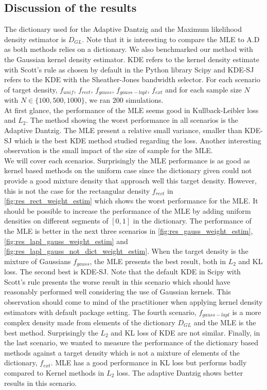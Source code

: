 \subsection{Discussion of the results}
The dictionary used for the Adaptive Dantzig and the Maximum likelihood density estimator is $D_{GL}$. Note that it is interesting to compare the MLE to A.D as both methods relies on a dictionary. We also benchmarked our method with the Gaussian kernel density estimator. KDE refers to the kernel density estimate with Scott's rule as chosen by default in the Python library Scipy and KDE-SJ refers to the KDE with the Sheather-Jones bandwidth selector. For each scenario of target density, $f_{unif}$, $f_{rect}$, $f_{gauss}$, $f_{gauss-lapl}$, $f_{ext}$ and for each sample size $N$  with $N\in\{100, 500, 1000\}$, we ran 200 simulations. \\
At first glance, the performance of the MLE seems good in Kullback-Leibler loss and $L_2$. The method showing the worst performance in all scenarios is the Adaptive Dantzig. The MLE present a relative small variance, smaller than KDE-SJ which is the best KDE method studied regarding the loss. Another interesting observation is the small impact of the size of sample for the MLE.\\
We will cover each scenarios. Surprisingly the MLE performance is as good as kernel based methods on the uniform case since the dictionary given could not provide a good mixture density that approach well this target density. However, this is not the case for the rectangular density $f_{rect}$ in \cref{fig:res_rect_weight_estim} which shows the worst performance for the MLE. It should be possible to increase the performance of the MLE by adding uniform densities on different segments of $[0,1]$ in the dictionary. The performance of the MLE is better in the next three scenarios in \cref{fig:res_gauss_weight_estim}, \cref{fig:res_lapl_gauss_weight_estim} and \cref{fig:res_lapl_gauss_not_dict_weight_estim}. When the target density is the mixture of Gaussians $f_{gauss}$, the MLE presents the best result, both in $L_2$ and KL loss. The second best is KDE-SJ. Note that the default KDE in Scipy with Scott's rule presents the worse result in this scenario which should have reasonably performed well considering the use of Gaussian kernels. This observation should come to mind of the practitioner when applying kernel density estimators with default package setting. The fourth scenario, $f_{gauss-lapl}$ is a more complex density made from elements of the dictionary $D_{GL}$ and the MLE is the best method. Surprisingly the $L_2$ and KL loss of KDE are not similar. Finally, in the last scenario, we wanted to measure the performance of the dictionary based methods against a target density which is not a mixture of elements of the dictionary, $f_{ext}$. MLE has a good performance in KL loss but performs badly compared to Kernel methods in $L_2$ loss. The adaptive Dantzig shows better results in this scenario.\\
